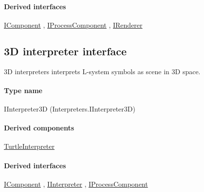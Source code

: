 	\paragraph{Derived interfaces}
		\hyperref[Malsys.Processing.Components.IComponent]{IComponent}%
, 		\hyperref[Malsys.Processing.Components.IProcessComponent]{IProcessComponent}%
, 		\hyperref[Malsys.Processing.Components.IRenderer]{IRenderer}%
	

\subsection{3D interpreter interface}
\label{Malsys.Processing.Components.Interpreters.IInterpreter3D}
3D interpreters interprets L-system symbols as scene in 3D space.\paragraph{Type name}
IInterpreter3D (Interpreters.IInterpreter3D) 	\paragraph{Derived components}
		\hyperref[Malsys.Processing.Components.Interpreters.TurtleInterpreter]{TurtleInterpreter}%
	\paragraph{Derived interfaces}
		\hyperref[Malsys.Processing.Components.IComponent]{IComponent}%
, 		\hyperref[Malsys.Processing.Components.IInterpreter]{IInterpreter}%
, 		\hyperref[Malsys.Processing.Components.IProcessComponent]{IProcessComponent}%
